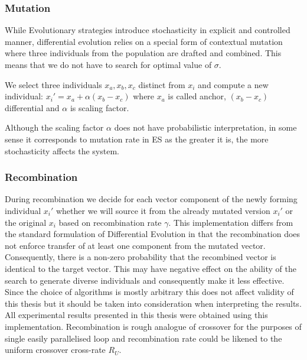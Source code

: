 \subsubsection{Mutation}
While Evolutionary strategies introduce stochasticity in explicit and controlled manner, differential evolution relies on a special form of contextual mutation where three individuals from the population are drafted and combined. This means that we do not have to search for optimal value of $ \sigma $. 

We select three individuals $ x_a, x_b, x_c $ distinct from $ x_i $ and compute a new individual: $ x_i' =  x_a + \alpha (x_b - x_c)$ where $ x_a $ is called anchor, $ (x_b - x_c) $ differential and $ \alpha $ is scaling factor. 

Although the scaling factor $ \alpha $ does not have probabilistic interpretation, in some sense it corresponds to mutation rate in ES as the greater it is, the more stochasticity affects the system.

\subsubsection{Recombination}
During recombination we decide for each vector component of the newly forming individual $ x_i' $ whether we will source it from  the already mutated version $ x_i' $ or the original $ x_i $ based on recombination rate $ \gamma $. This implementation differs from the standard formulation of Differential Evolution in that the recombination does not enforce transfer of at least one component from the mutated vector. Consequently, there is a non-zero probability that the recombined vector is identical to the target vector. This may have negative effect on the ability of the search to generate diverse individuals and consequently make it less effective. Since the choice of algorithms is mostly arbitrary this does not affect validity of this thesis but it should be taken into consideration when interpreting the results. All experimental results presented in this thesis were obtained using this implementation.    Recombination is rough analogue of crossover for the purposes of single easily parallelised loop and recombination rate could be likened to the uniform crossover cross-rate $ R_U $.

